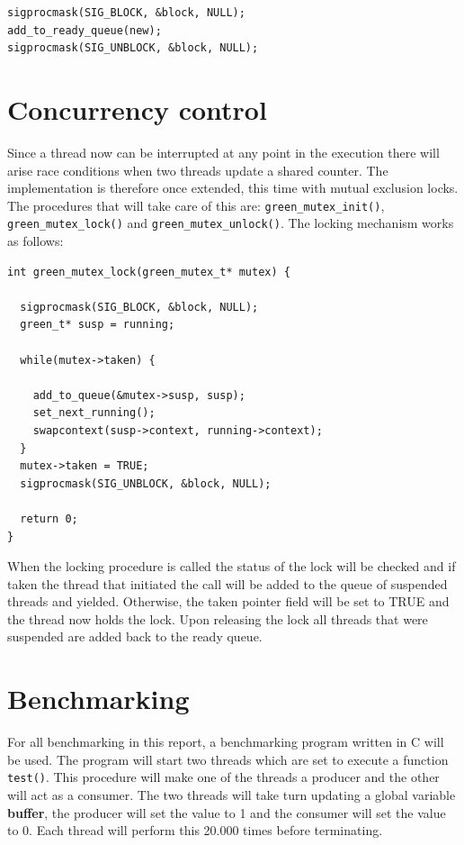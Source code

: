 \documentclass{article}
\begin{document}
\begin{verbatim}
sigprocmask(SIG_BLOCK, &block, NULL);
add_to_ready_queue(new);
sigprocmask(SIG_UNBLOCK, &block, NULL);
\end{verbatim}

\section{Concurrency control}
Since a thread now can be interrupted at any point in the execution there will arise race conditions when two threads update a shared counter. The implementation is therefore once extended, this time with mutual exclusion locks. The procedures that will take care of this are: \texttt{green\_mutex\_init()}, \texttt{green\_mutex\_lock()} and \texttt{green\_mutex\_unlock()}. The locking mechanism works as follows: 

\begin{verbatim}
int green_mutex_lock(green_mutex_t* mutex) {
  
  sigprocmask(SIG_BLOCK, &block, NULL);
  green_t* susp = running;
  
  while(mutex->taken) {
  
    add_to_queue(&mutex->susp, susp);
    set_next_running(); 
    swapcontext(susp->context, running->context);
  }
  mutex->taken = TRUE;
  sigprocmask(SIG_UNBLOCK, &block, NULL);
  
  return 0;
}
\end{verbatim}
When the locking procedure is called the status of the lock will be checked and if taken the thread that initiated the call will be added to the queue of suspended threads and yielded. Otherwise, the taken pointer field will be set to TRUE and the thread now holds the lock. Upon releasing the lock all threads that were suspended are added back to the ready queue.

\section{Benchmarking}
For all benchmarking in this report, a benchmarking program written in C will be used. The program will start two threads which are set to execute a function \texttt{test()}. This procedure will make one of the threads a producer and the other will act as a consumer. The two threads will take turn updating a global variable \textbf{buffer}, the producer will set the value to 1 and the consumer will set the value to 0. Each thread will perform this 20.000 times before terminating. 
\end{document}
